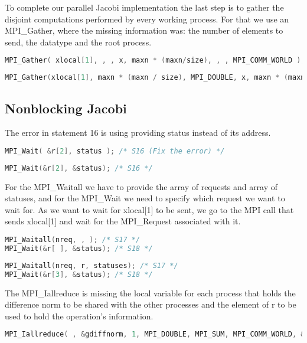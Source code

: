 \documentclass[a4paper, 10pt]{article}
\begin{document}
To complete our parallel Jacobi implementation the last step is to gather the disjoint computations performed by every working process. For that we use an MPI\_Gather, where the missing information was: the number of elements to send, the datatype and the root process.
    \begin{lstlisting}[language=c, caption={Template S15}]
MPI_Gather( xlocal[1], , , x, maxn * (maxn/size), , , MPI_COMM_WORLD ); /* S15 */
    \end{lstlisting}

    \begin{lstlisting}[language=c, caption={Correct S15}]
MPI_Gather(xlocal[1], maxn * (maxn / size), MPI_DOUBLE, x, maxn * (maxn / size), MPI_DOUBLE, 0, MPI_COMM_WORLD); /* S15 */
    \end{lstlisting}

\subsection{Nonblocking Jacobi}

The error in statement 16 is using providing status instead of its address.
    \begin{lstlisting}[language=c, caption={Template S16}]
MPI_Wait( &r[2], status ); /* S16 (Fix the error) */
    \end{lstlisting}

    \begin{lstlisting}[language=c, caption={Correct S16}]
MPI_Wait(&r[2], &status); /* S16 */
    \end{lstlisting}

For the MPI\_Waitall we have to provide the array of requests and array of statuses, and for the MPI\_Wait we need to specify which request we want to wait for. As we want to wait for xlocal[1] to be sent, we go to the MPI call that sends xlocal[1] and wait for the MPI\_Request associated with it. 
    \begin{lstlisting}[language=c, caption={Template S17, S18}]
MPI_Waitall(nreq, , ); /* S17 */
MPI_Wait(&r[ ], &status); /* S18 */
    \end{lstlisting}

    \begin{lstlisting}[language=c, caption={Correct S17, S18}]
MPI_Waitall(nreq, r, statuses); /* S17 */
MPI_Wait(&r[3], &status); /* S18 */
    \end{lstlisting}

The MPI\_Iallreduce is missing the local variable for each process that holds the difference norm to be shared with the other processes and the element of r to be used to hold the operation's information.
    \begin{lstlisting}[language=c, caption={Template S19}]
MPI_Iallreduce( , &gdiffnorm, 1, MPI_DOUBLE, MPI_SUM, MPI_COMM_WORLD, &r[ ]); /* S19 */
    \end{lstlisting}
\end{document}
